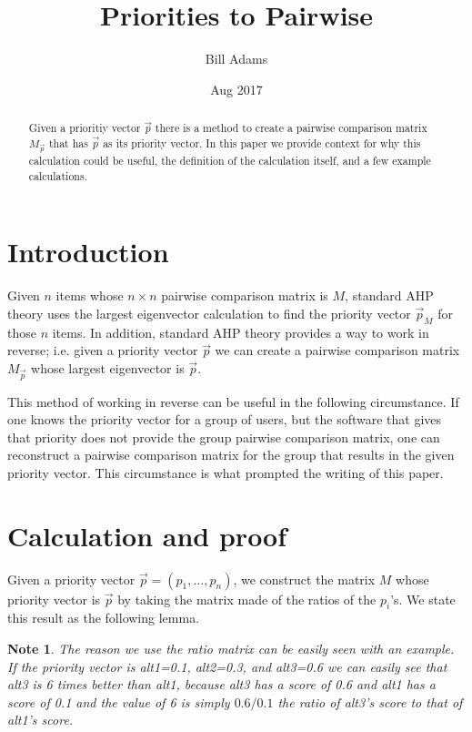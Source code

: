 \documentclass[10pt,twoside]{article}
\title{Priorities to Pairwise}
\author{Bill Adams}
\date{Aug 2017}
\newtheorem{note}{Note}
\begin{document}
\maketitle

\begin{abstract}
Given a prioritiy vector $\vec{p}$ there is a method to create a pairwise comparison matrix $M_{\vec{p}}$ that has $\vec{p}$ as its priority vector.  In this paper we provide context for why this calculation could be useful, the definition of the calculation itself, and a few example calculations.
\end{abstract}

\section{Introduction}
Given $n$ items whose $n \times n$ pairwise comparison matrix is $M$, standard
AHP theory uses the largest eigenvector calculation to find the priority vector
$\vec{p}_M$ for those $n$ items.  In addition, standard AHP theory provides a way
to work in reverse; i.e. given a priority vector $\vec{p}$ we can create a
pairwise comparison matrix $M_{\vec{p}}$ whose largest eigenvector is $\vec{p}$.

This method of working in reverse can be useful in the following circumstance.
If one knows the priority vector for a group of users, but the software that gives
that priority does not provide the group pairwise comparison matrix, one can
reconstruct a pairwise comparison matrix for the group that results in the
given priority vector.  This circumstance is what prompted the writing of this
paper.

\section{Calculation and proof}
Given a priority vector $\vec{p}=(p_1, \ldots, p_n)$, we construct the matrix $M$
whose priority vector is $\vec{p}$ by taking the matrix
made of the ratios of the $p_i$'s.  We state this result as the following lemma.

\begin{note}
The reason we use the ratio matrix can be easily seen with an example.  If the 
priority vector is alt1=0.1, alt2=0.3, and alt3=0.6 we can easily see that
alt3 is 6 times better than alt1, because alt3 has a score of 0.6 and alt1 has
a score of 0.1 and the value of 6 is simply $0.6/0.1$ the ratio of alt3's score
to that of alt1's score.
\end{note}
\end{document}
